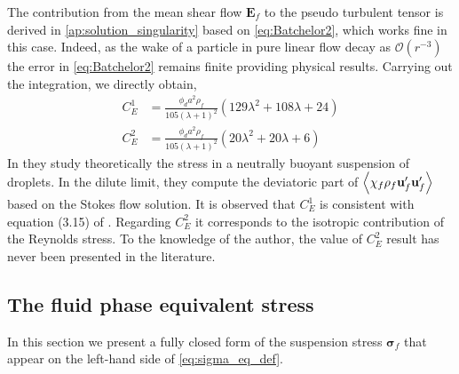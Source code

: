 The contribution from the mean shear flow $\textbf{E}_f$ to the pseudo turbulent tensor is derived in \ref{ap:solution_singularity} based on \ref{eq:Batchelor2}, which works fine in this case. 
Indeed, as the wake of a particle in pure linear flow decay as $\mathcal{O}(r^{-3})$ the error in \ref{eq:Batchelor2} remains finite providing physical results. 
Carrying out the integration, we directly obtain, 
\begin{align}
    C_E^1  &= \frac{\phi_d a^2 \rho_f}{105 (\lambda +1)^2 } (129\lambda^2+108\lambda+24)\\
    C_E^2 &= \frac{\phi_d a^2 \rho_f}{105 (\lambda +1)^2 } (20\lambda^2 +20\lambda + 6)
\end{align}
In  \citet{raja2010inertial} they study theoretically the stress in a neutrally buoyant suspension of droplets. 
In the dilute limit, they compute the deviatoric part of $\left<\chi_f \rho_f \textbf{u}_f' \textbf{u}_f'\right>$ based on the Stokes flow solution. 
It is observed that $C_E^1$ is consistent with equation (3.15) of \citet{raja2010inertial}.
Regarding $C_E^2$ it corresponds to the isotropic contribution of the Reynolds stress.
To the knowledge of the author, the value of $C_E^2$ result has never been presented in the literature.


\subsection{The fluid phase equivalent stress}

In this section we present a fully closed form of the suspension stress $\bm{\sigma}_f$ that appear on the left-hand side of 
\ref{eq:sigma_eq_def}. 

